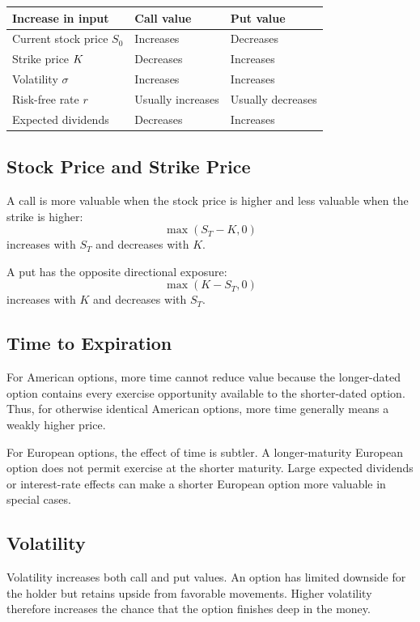 \begin{center}
\begin{tabular}{lll}
\toprule
Increase in input & Call value & Put value \\
\midrule
Current stock price $S_0$ & Increases & Decreases \\
Strike price $K$ & Decreases & Increases \\
Volatility $\sigma$ & Increases & Increases \\
Risk-free rate $r$ & Usually increases & Usually decreases \\
Expected dividends & Decreases & Increases \\
\bottomrule
\end{tabular}
\end{center}

\subsection{Stock Price and Strike Price}

A call is more valuable when the stock price is higher and less valuable when
the strike is higher:
\[
    \max(S_T-K,0)
\]
increases with $S_T$ and decreases with $K$.

A put has the opposite directional exposure:
\[
    \max(K-S_T,0)
\]
increases with $K$ and decreases with $S_T$.

\subsection{Time to Expiration}

For American options, more time cannot reduce value because the longer-dated
option contains every exercise opportunity available to the shorter-dated
option. Thus, for otherwise identical American options, more time generally
means a weakly higher price.

For European options, the effect of time is subtler. A longer-maturity European
option does not permit exercise at the shorter maturity. Large expected
dividends or interest-rate effects can make a shorter European option more
valuable in special cases.

\subsection{Volatility}

Volatility increases both call and put values. An option has limited downside
for the holder but retains upside from favorable movements. Higher volatility
therefore increases the chance that the option finishes deep in the money.

